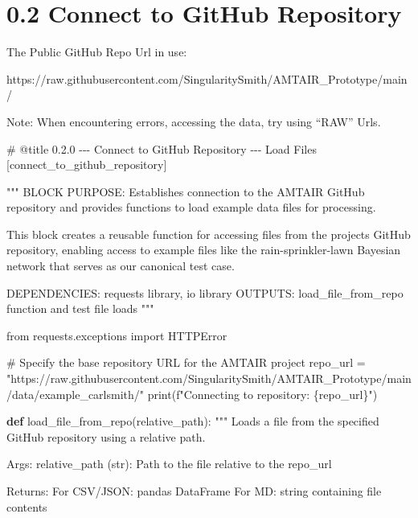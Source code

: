 \documentclass[
  11pt,
  letterpaper,
]{book}
\newenvironment{Shaded}{\begin{snugshade}}{\end{snugshade}}
\newcommand{\BuiltInTok}[1]{\textcolor[rgb]{0.00,0.23,0.31}{#1}}
\newcommand{\CommentTok}[1]{\textcolor[rgb]{0.37,0.37,0.37}{#1}}
\newcommand{\ImportTok}[1]{\textcolor[rgb]{0.00,0.46,0.62}{#1}}
\newcommand{\KeywordTok}[1]{\textcolor[rgb]{0.00,0.23,0.31}{\textbf{#1}}}
\newcommand{\NormalTok}[1]{\textcolor[rgb]{0.00,0.23,0.31}{#1}}
\newcommand{\OperatorTok}[1]{\textcolor[rgb]{0.37,0.37,0.37}{#1}}
\newcommand{\SpecialCharTok}[1]{\textcolor[rgb]{0.37,0.37,0.37}{#1}}
\newcommand{\SpecialStringTok}[1]{\textcolor[rgb]{0.13,0.47,0.30}{#1}}
\newcommand{\StringTok}[1]{\textcolor[rgb]{0.13,0.47,0.30}{#1}}
\begin{document}
\section{0.2 Connect to GitHub
Repository}\label{connect-to-github-repository}

The Public GitHub Repo Url in use:

https://raw.githubusercontent.com/SingularitySmith/AMTAIR\_Prototype/main/

Note: When encountering errors, accessing the data, try using ``RAW''
Urls.

\label{connect_to_github_repository}
\begin{Shaded}
\begin{Highlighting}[]
\CommentTok{\# @title 0.2.0 {-}{-}{-} Connect to GitHub Repository {-}{-}{-} Load Files [connect\_to\_github\_repository]}

\CommentTok{"""}
\CommentTok{BLOCK PURPOSE: Establishes connection to the AMTAIR GitHub repository and provides}
\CommentTok{functions to load example data files for processing.}

\CommentTok{This block creates a reusable function for accessing files from the project\textquotesingle{}s}
\CommentTok{GitHub repository, enabling access to example files like the rain{-}sprinkler{-}lawn}
\CommentTok{Bayesian network that serves as our canonical test case.}

\CommentTok{DEPENDENCIES: requests library, io library}
\CommentTok{OUTPUTS: load\_file\_from\_repo function and test file loads}
\CommentTok{"""}

\ImportTok{from}\NormalTok{ requests.exceptions }\ImportTok{import}\NormalTok{ HTTPError}

\CommentTok{\# Specify the base repository URL for the AMTAIR project}
\NormalTok{repo\_url }\OperatorTok{=} \StringTok{"https://raw.githubusercontent.com/SingularitySmith/AMTAIR\_Prototype/main/data/example\_carlsmith/"}
\BuiltInTok{print}\NormalTok{(}\SpecialStringTok{f"Connecting to repository: }\SpecialCharTok{\{}\NormalTok{repo\_url}\SpecialCharTok{\}}\SpecialStringTok{"}\NormalTok{)}

\KeywordTok{def}\NormalTok{ load\_file\_from\_repo(relative\_path):}
    \CommentTok{"""}
\CommentTok{    Loads a file from the specified GitHub repository using a relative path.}

\CommentTok{    Args:}
\CommentTok{        relative\_path (str): Path to the file relative to the repo\_url}

\CommentTok{    Returns:}
\CommentTok{        For CSV/JSON: pandas DataFrame}
\CommentTok{        For MD: string containing file contents}


\end{Highlighting}
\end{Shaded}
\end{document}
